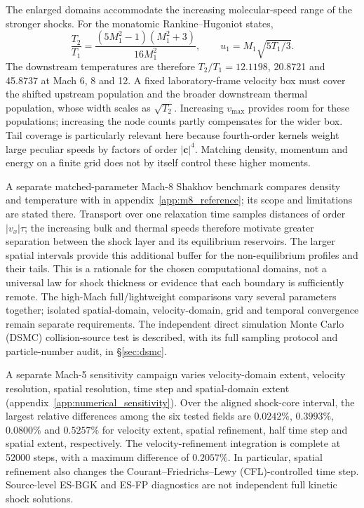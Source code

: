 \documentclass[lineno,paper]{JFM-FLM_Au}
\newenvironment{revision}{\nolinenumbers\begin{tcolorbox}[breakable,colback=revisionyellow,colframe=revisionyellow,boxrule=0pt,arc=0pt,left=5pt,right=5pt,top=5pt,bottom=5pt,before skip=6pt,after skip=6pt]\captionsetup{width=\linewidth}}{\end{tcolorbox}\linenumbers}
\newenvironment{revision}{}{}
\begin{document}
\begin{revision}
The enlarged domains accommodate the increasing molecular-speed range of the stronger shocks. For the monatomic Rankine--Hugoniot states,
\begin{equation}
 \frac{T_2}{T_1}=\frac{(5M_1^2-1)(M_1^2+3)}{16M_1^2},
 \qquad u_1=M_1\sqrt{5T_1/3}.
 \label{eq:high_mach_temperature}
\end{equation}
The downstream temperatures are therefore $T_2/T_1=12.1198$, 20.8721 and 45.8737 at Mach 6, 8 and 12. A fixed laboratory-frame velocity box must cover the shifted upstream population and the broader downstream thermal population, whose width scales as $\sqrt{T_2}$. Increasing $v_{\max}$ provides room for these populations; increasing the node counts partly compensates for the wider box. Tail coverage is particularly relevant here because fourth-order kernels weight large peculiar speeds by factors of order $|\boldsymbol c|^4$. Matching density, momentum and energy on a finite grid does not by itself control these higher moments.
\end{revision}

\begin{revision}
A separate matched-parameter Mach-8 Shakhov benchmark compares density and temperature with \citet{ChenXuCai2013} in appendix~\ref{app:m8_reference}; its scope and limitations are stated there. 
Transport over one relaxation time samples distances of order $|v_x|\tau$; the increasing bulk and thermal speeds therefore motivate greater separation between the shock layer and its equilibrium reservoirs. The larger spatial intervals provide this additional buffer for the non-equilibrium profiles and their tails. This is a rationale for the chosen computational domains, not a universal law for shock thickness or evidence that each boundary is sufficiently remote. The high-Mach full/lightweight comparisons vary several parameters together; isolated spatial-domain, velocity-domain, grid and temporal convergence remain separate requirements.
The independent direct simulation Monte Carlo (DSMC) collision-source test is described, with its full sampling protocol and particle-number audit, in \S\ref{sec:dsmc}.
\end{revision}
\begin{revision}
A separate Mach-5 sensitivity campaign varies velocity-domain extent, velocity resolution, spatial resolution, time step and spatial-domain extent (appendix~\ref{app:numerical_sensitivity}). Over the aligned shock-core interval, the largest relative differences among the six tested fields are $0.0242\%$, $0.3993\%$, $0.0800\%$ and $0.5257\%$ for velocity extent, spatial refinement, half time step and spatial extent, respectively. The velocity-refinement integration is complete at 52000 steps, with a maximum difference of $0.2057\%$. In particular, spatial refinement also changes the Courant--Friedrichs--Lewy (CFL)-controlled time step. Source-level ES-BGK and ES-FP diagnostics are not independent full kinetic shock solutions.
\end{revision}
\end{document}
